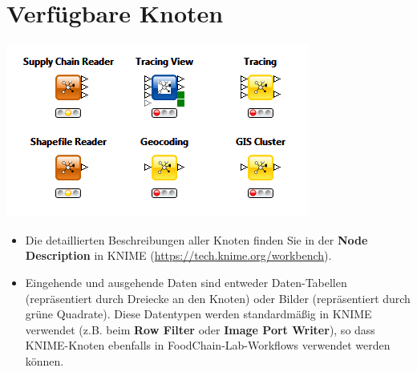 \documentclass{beamer}
\begin{document}
\section{Verfügbare Knoten}
\begin{frame}
	\begin{center}
  		\includegraphics[height=0.4\textheight]{1.png}
	\end{center}
	\begin{itemize}
		\item Die detaillierten Beschreibungen aller Knoten finden Sie in der \textbf{Node Description} in KNIME (\url{https://tech.knime.org/workbench}).
		\item Eingehende und ausgehende Daten sind entweder Daten-Tabellen (repräsentiert durch Dreiecke an den Knoten) oder Bilder (repräsentiert durch grüne Quadrate). Diese Datentypen werden standardmäßig in KNIME verwendet (z.B. beim \textbf{Row Filter} oder \textbf{Image Port Writer}), so dass KNIME-Knoten ebenfalls in FoodChain-Lab-Workflows verwendet werden können.
	\end{itemize}
\end{frame}
 
\end{document}
